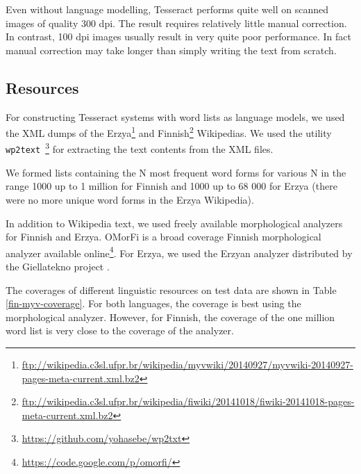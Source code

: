 \documentclass[b5paper]{article}
\begin{document}
Even without language modelling, Tesseract performs quite well on
scanned images of quality 300 dpi. The result requires relatively
little manual correction. In contrast, 100 dpi images usually result
in very quite poor performance. In fact manual correction may take
longer than simply writing the text from scratch.

\subsection{Resources}
For constructing Tesseract systems with word lists as language models,
we used the XML dumps of the
Erzya\footnote{\url{ftp://wikipedia.c3sl.ufpr.br/wikipedia/myvwiki/20140927/myvwiki-20140927-pages-meta-current.xml.bz2}}
and
Finnish\footnote{\url{ftp://wikipedia.c3sl.ufpr.br/wikipedia/fiwiki/20141018/fiwiki-20141018-pages-meta-current.xml.bz2}}
Wikipedias. We used the utility {\tt
  wp2text}~\footnote{\url{https://github.com/yohasebe/wp2txt}} for
extracting the text contents from the XML files.

We formed lists containing the N most frequent word forms for various
N in the range 1000 up to 1 million for Finnish and 1000 up to 68 000
for Erzya (there were no more unique word forms in the Erzya
Wikipedia).
 
In addition to Wikipedia text, we used freely available morphological
analyzers for Finnish and Erzya. OMorFi \cite{pirinen11} is a broad
coverage Finnish morphological analyzer available
online\footnote{\url{https://code.google.com/p/omorfi/}}. For Erzya,
we used the Erzyan analyzer distributed by the Giellatekno project
\cite{moshagen14}.

The coverages of different linguistic resources on test data are shown
in Table \ref{fin-myv-coverage}. For both languages, the coverage is
best using the morphological analyzer. However, for Finnish, the
coverage of the one million word list is very close to the coverage of
the analyzer.
\end{document}
